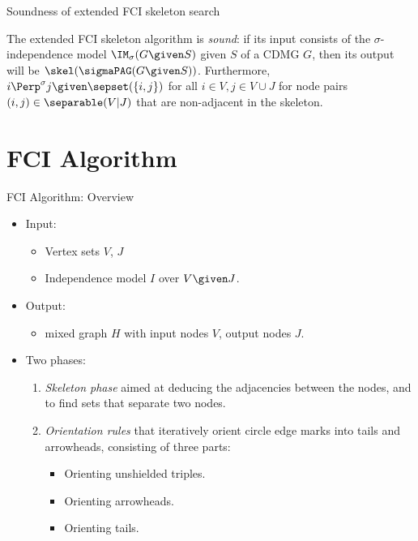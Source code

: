 \begin{frame}{Soundness of extended FCI skeleton search}
\begin{Thm}[\ref{thm:fci_skeleton_sound}]
  The extended FCI skeleton algorithm is \emph{sound}: if its input consists of the $\sigma$-independence model $\IM_\sigma(G \given S)$ given $S$ of a CDMG $G$, then its output will be $\skel(\sigmaPAG(G \given S))$. Furthermore, $i \Perp^\sigma j \given \sepset(\{i,j\})$ for all $i \in V, j \in V \cup J$ for node pairs $(i,j) \in \separable(V|J)$ that are non-adjacent in the skeleton.
\end{Thm}
\end{frame}

\section{FCI Algorithm}
\frame{\sectionpage}

\begin{frame}{FCI Algorithm: Overview}
  \begin{itemize} 
    \item Input: 
      \begin{itemize}
        \item Vertex sets $V$, $J$
        \item Independence model $I$ over $V \given J$.
      \end{itemize}
    \item Output: 
      \begin{itemize}
        \item mixed graph $H$ with input nodes $V$, output nodes $J$.
      \end{itemize}
    \item Two phases:
      \begin{enumerate}
        \item \emph{Skeleton phase} aimed at deducing the adjacencies between the nodes, and to find sets that separate two nodes.
        \item \emph{Orientation rules} that iteratively orient circle edge marks into tails and arrowheads, consisting of three parts:
          \begin{itemize}
        \item Orienting unshielded triples.
        \item Orienting arrowheads.
        \item Orienting tails.
          \end{itemize}
       \end{enumerate}
  \end{itemize}
\end{frame}

